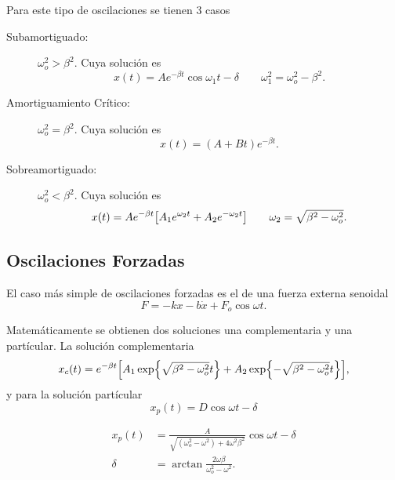 Para este tipo de oscilaciones se tienen $3$ casos
\begin{description}
	\item[Subamortiguado: ] $\omega _o ^2 > \beta ^2$. Cuya solución es
		\begin{equation}
			x(t) = A e^{-\beta t} \cos{\omega _1 t - \delta} \qquad \omega _1 ^2 = \omega _o ^2 - \beta ^2.
		\end{equation}
	\item[Amortiguamiento Crítico: ] $\omega _o ^2 = \beta ^2$. Cuya solución es
		\begin{equation}
			x(t) = (A + Bt) e^{-\beta t}.
		\end{equation}
	\item[Sobreamortiguado: ] $\omega _o ^2 < \beta ^2$. Cuya solución es
		\begin{equation}
			x(t) = A e^{-\beta t} \qty[A_1 e^{\omega _2 t} + A_2 e^{-\omega _2 t}] \qquad \omega _2 = \sqrt{\beta ^2 - \omega _o ^2}.
		\end{equation}
\end{description}


\subsection{Oscilaciones Forzadas}
El caso más simple de oscilaciones forzadas es el de una fuerza externa senoidal
\begin{equation}
	F = -kx - b\dot{x} + F_o \cos{\omega t}.
\end{equation}

Matemáticamente se obtienen dos soluciones una complementaria y una partícular. La solución complementaria
\begin{equation}
	x_c (t) = e^{-\beta t} \qty[A_1 \exp{\sqrt{\beta ^2 - \omega _o ^2}t} + A_2 \exp{-\sqrt{\beta ^2 - \omega _o ^2}t}],
\end{equation}
y para la solución partícular
\begin{equation}
	x_p (t) = D \cos{\omega t - \delta}
\end{equation}

\begin{align*}
	x_p (t) &= \frac{A}{\sqrt{(\omega _o ^2 - \omega ^2) + 4\omega ^2 \beta ^2}} \cos{\omega t - \delta} \\
	\delta &= \arctan{\frac{2\omega \beta}{\omega _o ^2 - \omega ^2}}.
\end{align*}













